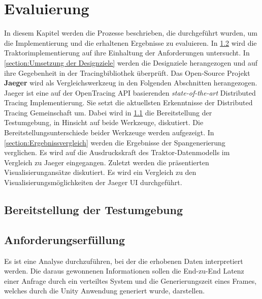 %

\chapter{Evaluierung}
\label{chapter:Evaluierung}
In diesem Kapitel werden die Prozesse beschrieben, die durchgeführt wurden, um die Implementierung und die erhaltenen Ergebnisse zu evaluieren. In \cref{section:Anforderungserfüllung} wird die Traktorimplementierung auf ihre Einhaltung der Anforderungen  untersucht. In \cref{section:Umsetzung der Designziele} werden die Designziele herangezogen und auf ihre Gegebenheit in der Tracingbibliothek überprüft. Das Open-Source Projekt \textbf{Jaeger} wird als Vergleichswerkzeug in den Folgenden Abschnitten herangezogen. Jaeger ist eine auf der OpenTracing API basierenden \emph{state-of-the-art} Distributed Tracing Implementierung. Sie setzt die aktuellsten Erkenntnisse der Distributed Tracing Gemeinschaft um. Dabei wird in \cref{section:Bereitstellung der Testumgebung} die Bereitstellung der Testumgebung, in Hinsicht auf beide Werkzeuge, diskutiert. Die Bereitstellungsunterschiede beider Werkzeuge werden aufgezeigt. In \cref{section:Ergebnissvergleich} werden die Ergebnisse der Spangenerierung verglichen. Es wird auf die Ausdruckskraft des Traktor-Datenmodells im Vergleich zu Jaeger eingegangen. Zuletzt werden die präsentierten Visualisierungansätze diskutiert. Es wird ein Vergleich zu den Visualisierungsmöglichkeiten der Jaeger UI durchgeführt.

\section{Bereitstellung der Testumgebung}
\label{section:Bereitstellung der Testumgebung}

\section{Anforderungserfüllung}
\label{section:Anforderungserfüllung}

Es ist eine Analyse durchzuführen, bei der die erhobenen Daten interpretiert werden. Die daraus gewonnenen Informationen sollen die End-zu-End Latenz einer Anfrage durch ein verteiltes System und die Generierungszeit eines Frames, welches durch die Unity Anwendung generiert wurde, darstellen. 

